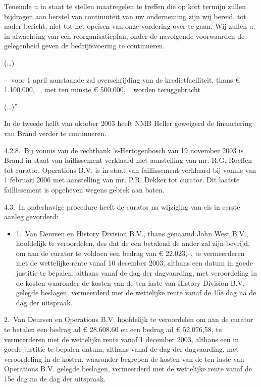 \documentclass[
  dutch,
  a4paper,
]{article}
\providecommand{\tightlist}{%
  \setlength{\itemsep}{0pt}\setlength{\parskip}{0pt}}
\begin{document}
Teneinde u in staat te stellen maatregelen te treffen die op kort termijn zullen bijdragen aan herstel van continuïteit van uw onderneming zijn wij bereid, tot nader bericht, niet tot het opeisen van onze vordering over te gaan. Wij zullen u, in afwachting van een reorganisatieplan, onder de navolgende voorwaarden de gelegenheid geven de bedrijfsvoering te continueren.

(\ldots)

-- voor 1 april aanstaande zal overschrijding van de kredietfaciliteit, thans € 1.100.000,=, met ten minste € 500.000,= worden teruggebracht

(\ldots)''

In de tweede helft van oktober 2003 heeft NMB Heller geweigerd de financiering van Brand verder te continueren.

4.2.8. Bij vonnis van de rechtbank 's-Hertogenbosch van 19 november 2003 is Brand in staat van faillissement verklaard met aanstelling van mr. R.G. Roeffen tot curator. Operations B.V. is in staat van faillissement verklaard bij vonnis van 1 februari 2006 met aanstelling van mr. P.R. Dekker tot curator. Dit laatste faillissement is opgeheven wegens gebrek aan baten.

4.3. In onderhavige procedure heeft de curator na wijziging van eis in eerste aanleg gevorderd:

\begin{itemize}
\tightlist
\item
  1. Van Deursen en History Division B.V., thans genaamd John West B.V., hoofdelijk te veroordelen, des dat de een betalend de ander zal zijn bevrijd, om aan de curator te voldoen een bedrag van € 22.023,--, te vermeerderen met de wettelijke rente vanaf 10 december 2003, althans een datum in goede justitie te bepalen, althans vanaf de dag der dagvaarding, met veroordeling in de kosten waaronder de kosten van de ten laste van History Division B.V. gelegde beslagen, vermeerderd met de wettelijke rente vanaf de 15e dag na de dag der uitspraak.
\end{itemize}

2. Van Deursen en Operations B.V. hoofdelijk te veroordelen om aan de curator te betalen een bedrag ad € 28.608,60 en een bedrag ad € 52.076,58, te vermeerderen met de wettelijke rente vanaf 1 december 2003, althans een in goede justitie te bepalen datum, althans vanaf de dag der dagvaarding, met veroordeling in de kosten, waaronder begrepen de kosten van de ten laste van Operations B.V. gelegde beslagen, vermeerderd met de wettelijke rente vanaf de 15e dag na de dag der uitspraak.
\end{document}
